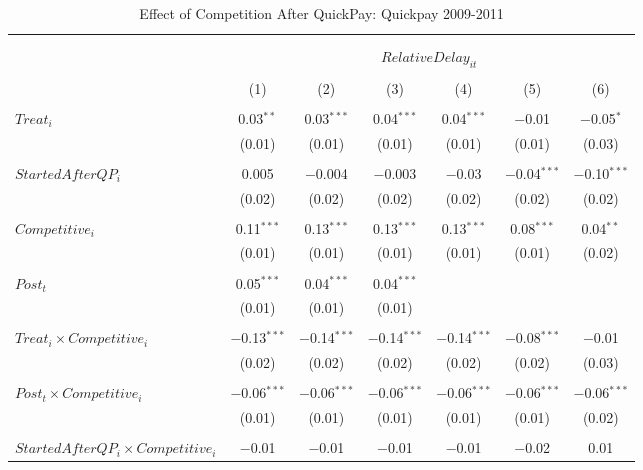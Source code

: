 \documentclass[
]{article}
\begin{document}
\begin{table}[H] \centering 
  \caption{Effect of Competition After QuickPay: Quickpay 2009-2011} 
  \label{} 
\small 
\begin{tabular}{@{\extracolsep{-3pt}}lcccccc} 
\\[-1.8ex]\hline 
\hline \\[-1.8ex] 
\\[-1.8ex] & \multicolumn{6}{c}{$RelativeDelay_{it}$  } \\ 
\\[-1.8ex] & (1) & (2) & (3) & (4) & (5) & (6)\\ 
\hline \\[-1.8ex] 
 $Treat_i$ & 0.03$^{**}$ & 0.03$^{***}$ & 0.04$^{***}$ & 0.04$^{***}$ & $-$0.01 & $-$0.05$^{*}$ \\ 
  & (0.01) & (0.01) & (0.01) & (0.01) & (0.01) & (0.03) \\ 
  & & & & & & \\ 
 $StartedAfterQP_i$ & 0.005 & $-$0.004 & $-$0.003 & $-$0.03 & $-$0.04$^{***}$ & $-$0.10$^{***}$ \\ 
  & (0.02) & (0.02) & (0.02) & (0.02) & (0.02) & (0.02) \\ 
  & & & & & & \\ 
 $Competitive_i$ & 0.11$^{***}$ & 0.13$^{***}$ & 0.13$^{***}$ & 0.13$^{***}$ & 0.08$^{***}$ & 0.04$^{**}$ \\ 
  & (0.01) & (0.01) & (0.01) & (0.01) & (0.01) & (0.02) \\ 
  & & & & & & \\ 
 $Post_t$ & 0.05$^{***}$ & 0.04$^{***}$ & 0.04$^{***}$ &  &  &  \\ 
  & (0.01) & (0.01) & (0.01) &  &  &  \\ 
  & & & & & & \\ 
 $Treat_i \times Competitive_i$ & $-$0.13$^{***}$ & $-$0.14$^{***}$ & $-$0.14$^{***}$ & $-$0.14$^{***}$ & $-$0.08$^{***}$ & $-$0.01 \\ 
  & (0.02) & (0.02) & (0.02) & (0.02) & (0.02) & (0.03) \\ 
  & & & & & & \\ 
 $Post_t \times Competitive_i$ & $-$0.06$^{***}$ & $-$0.06$^{***}$ & $-$0.06$^{***}$ & $-$0.06$^{***}$ & $-$0.06$^{***}$ & $-$0.06$^{***}$ \\ 
  & (0.01) & (0.01) & (0.01) & (0.01) & (0.01) & (0.02) \\ 
  & & & & & & \\ 
 $StartedAfterQP_i \times Competitive_i$ & $-$0.01 & $-$0.01 & $-$0.01 & $-$0.01 & $-$0.02 & 0.01 \\ 

\end{tabular}
\end{table}
\end{document}
